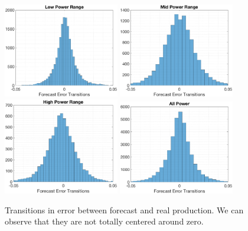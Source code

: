 \documentclass[11pt]{article}
\theoremstyle{definition}
\begin{document}
\begin{figure}[H]
\centering
\includegraphics[width=0.45\textwidth]{plots/LP_t.eps}
\includegraphics[width=0.45\textwidth]{plots/MP_t.eps}\\
\includegraphics[width=0.45\textwidth]{plots/HP_t.eps}
\includegraphics[width=0.45\textwidth]{plots/AP_t.eps}
\caption{Transitions in error between forecast and real production. We can observe that they are not totally centered around zero.}
\label{fig:error_transitions}
\end{figure}

\end{document}
